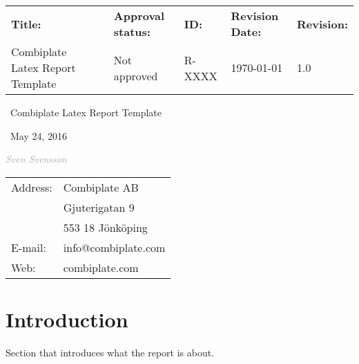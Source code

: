 \documentclass[]{article}
\newcommand{\code}[2][Black]{\textcolor{#1}{\textit{#2}}}
\begin{document}
\begin{titlepage}
	\raggedright
	
	\footnotesize
	\begin{tabularx}{\textwidth}{l X l l l l }
		\textbf{Title:} & & \textbf{Approval status:} & \textbf{ID:} & \textbf{Revision Date:} & \textbf{Revision:}\\
		Combiplate Latex Report Template & & Not approved & R-XXXX & \today & 1.0
	\end{tabularx}
	
	\null\vspace{4cm}
	\noindent\hrulefill\par
	{\Huge\ Combiplate Latex Report Template\par}
	\noindent\hrulefill\par
	
	{\Large\ May 24, 2016\par}
	
	\vspace{0.5 cm}
	{\Large\code[darkgray]{Sven Svensson}}
	
	\vfill
	\hspace{9.5cm}
	\footnotesize
	\begin{tabular}{ l l }
		Address: & Combiplate AB \\ 
		& Gjuterigatan 9 \\  
		& 553 18 Jönköping \\
		E-mail: & info@combiplate.com \\
		Web: & combiplate.com	     
	\end{tabular}

\end{titlepage}

\section {Introduction}
Section that introduces what the report is about. 
\end{document}
